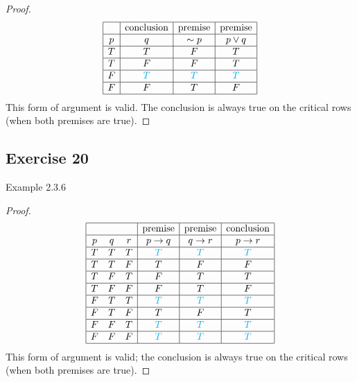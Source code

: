 \documentclass[14pt]{extarticle}
\begin{document}
\begin{proof}
    $$
        \begin{array}{|c|c|c|c|}
            \hline
              & \text{conclusion} & \text{premise} & \text{premise} \\ \hline p & q & {\sim p} & p \vee q \\
            \hline
            T & T                 & F              & T              \\
            \hline
            T & F                 & F              & T              \\
            \hline
            F & \color{cyan} T    & \color{cyan} T & \color{cyan} T \\
            \hline
            F & F                 & T              & F              \\
            \hline
        \end{array}
    $$
    This form of argument is valid. The conclusion is always true on the critical rows (when both premises are true).
\end{proof}

\subsection{Exercise 20}
Example 2.3.6

\begin{proof}
    $$
        \begin{array}{|ccc|c|c|c|}
            \hline
              &   &   & \text{premise} & \text{premise} & \text{conclusion} \\ \hline
            p & q & r & p \to q        & q \to r        & p \to r           \\ \hline T & T & T & \color{cyan} T & \color{cyan} T & \color{cyan} T \\
            \hline
            T & T & F & T              & F              & F                 \\
            \hline
            T & F & T & F              & T              & T                 \\
            \hline
            T & F & F & F              & T              & F                 \\
            \hline
            F & T & T & \color{cyan} T & \color{cyan} T & \color{cyan} T    \\
            \hline
            F & T & F & T              & F              & T                 \\
            \hline
            F & F & T & \color{cyan} T & \color{cyan} T & \color{cyan} T    \\ \hline F & F & F & \color{cyan} T & \color{cyan} T & \color{cyan} T \\
            \hline
        \end{array}
    $$
    This form of argument is valid; the conclusion is always true on the critical rows (when both premises are true).
\end{proof}
\end{document}
